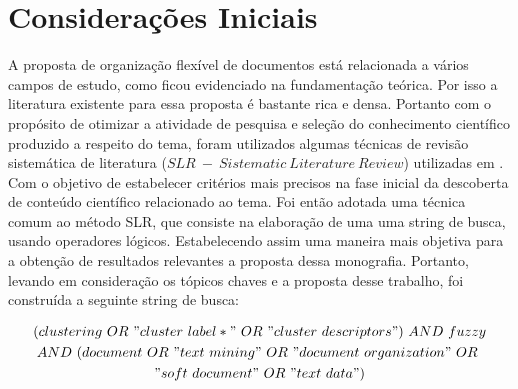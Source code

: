 %


\section{Considerações Iniciais}

A proposta de organização flexível de documentos está relacionada a vários campos de estudo, 
como ficou evidenciado na fundamentação teórica. Por isso a literatura existente para essa proposta 
é bastante rica e densa. Portanto com o propósito de otimizar a atividade de pesquisa e seleção
do conhecimento científico produzido a respeito do tema, foram utilizados algumas técnicas de 
revisão sistemática de literatura ($SLR\ -\ Sistematic\ Literature\ Review$) utilizadas em \cite{Rios2010}. 
Com o objetivo de estabelecer critérios mais precisos na fase inicial da descoberta de conteúdo
científico relacionado ao tema. Foi então adotada uma técnica comum ao método SLR, que consiste na 
elaboração de uma uma string de busca, usando operadores lógicos. Estabelecendo assim uma 
maneira mais objetiva para a obtenção de resultados relevantes a proposta dessa monografia.
Portanto, levando em consideração os tópicos chaves e a proposta desse trabalho, foi 
construída a seguinte string de busca: 

\begin{multline}
(clustering\ OR\ "cluster\ label*"\ OR\ "cluster\ descriptors")\ AND\ fuzzy \\ 
AND\ (document\ OR\ "text\ mining"\ OR\ "document\ organization"\ OR\ \\
"soft\ document"\ OR\ "text\ data")
\label{eq:busca}
\end{multline}

